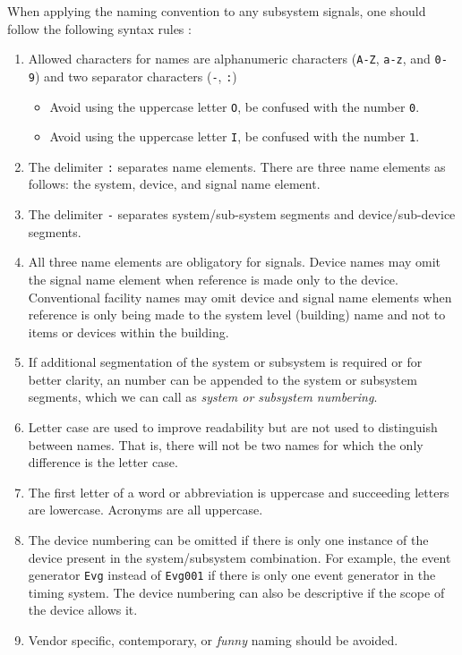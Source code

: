 \documentclass[11pt
  , a4paper
  , article
  , oneside
]{memoir}
\begin{document}
When applying the naming convention to any subsystem signals, one should follow the following syntax rules :
\begin{enumerate}
\item  Allowed characters for names are alphanumeric characters (\texttt{A-Z}, \texttt{a-z}, and \texttt{0-9}) and two separator characters (\texttt{-}, \texttt{:})
  \begin{itemize}
    \item Avoid using the uppercase letter \texttt{O}, be confused with the number \texttt{0}.
    \item Avoid using the uppercase letter \texttt{I}, be confused with the number \texttt{1}.
  \end{itemize}
\item The delimiter \texttt{:} separates name elements. There are three name elements as follows: the system, device, and signal name element. 
\item The delimiter \texttt{-} separates system/sub-system segments and device/sub-device segments.

\item All three name elements are obligatory for signals. Device names may omit the signal name element when reference is made only to the device. Conventional facility names may omit device and signal name elements when reference is only being made to the system level (building) name and not to items or devices within the building.

\item If additional segmentation of the system or subsystem is required or for better clarity, an number can be appended to the system or subsystem segments, which we can call as \textit{system or subsystem numbering}.

\item Letter case are used to improve readability but are not used to distinguish between names. That is, there will not be two names for which the only difference is the letter case.

\item The first letter of a word or abbreviation is uppercase and succeeding letters are lowercase. Acronyms are all uppercase.

\item The device numbering can be omitted if there is only one instance of the device present in the system/subsystem combination. For example, the event generator \texttt{Evg} instead of \texttt{Evg001} if there is only one event generator in the timing system. The device numbering can also be descriptive if the scope of the device allows it.

\item Vendor specific, contemporary, or \textit{funny} naming should be avoided. 


\end{enumerate}
\end{document}
